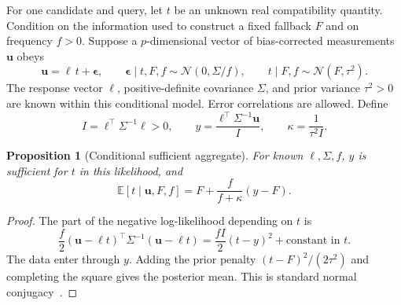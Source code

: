 \documentclass[11pt,a4paper]{article}
\newtheorem{proposition}{Proposition}
\newcommand{\E}{\mathbb E}
\newcommand{\Normal}{\mathcal N}
\begin{document}
For one candidate and query, let $t$ be an unknown real compatibility
quantity. Condition on the information used to construct a fixed fallback
$F$ and on frequency $f>0$. Suppose a $p$-dimensional vector of
bias-corrected measurements $\mathbf u$ obeys
\begin{equation}
 \mathbf u=\boldsymbol\ell\,t+\boldsymbol\epsilon,\qquad
 \boldsymbol\epsilon\mid t,F,f\sim\Normal(0,\Sigma/f),\qquad
 t\mid F,f\sim\Normal(F,\tau^2).
 \label{eq:normalmodel}
\end{equation}
The response vector $\boldsymbol\ell$, positive-definite covariance
$\Sigma$, and prior variance $\tau^2>0$ are known within this conditional
model. Error correlations are allowed. Define
\begin{equation}
 I=\boldsymbol\ell^\top\Sigma^{-1}\boldsymbol\ell>0,\qquad
 y=\frac{\boldsymbol\ell^\top\Sigma^{-1}\mathbf u}{I},\qquad
 \kappa=\frac1{\tau^2 I}.
\end{equation}

\begin{proposition}[Conditional sufficient aggregate]
For known $\boldsymbol\ell,\Sigma,f$, $y$ is sufficient for $t$ in this
likelihood, and
\begin{equation}
 \E[t\mid\mathbf u,F,f]
    =F+\frac{f}{f+\kappa}(y-F).
\end{equation}
\end{proposition}
\begin{proof}
The part of the negative log-likelihood depending on $t$ is
\begin{equation}
 \frac f2(\mathbf u-\boldsymbol\ell t)^\top
       \Sigma^{-1}(\mathbf u-\boldsymbol\ell t)
   =\frac{fI}{2}(t-y)^2+\text{constant in }t.
\end{equation}
The data enter through $y$. Adding the prior penalty
$(t-F)^2/(2\tau^2)$ and completing the square gives the posterior mean.
This is standard normal conjugacy~\cite{murphy2007}.
\end{proof}
\end{document}
